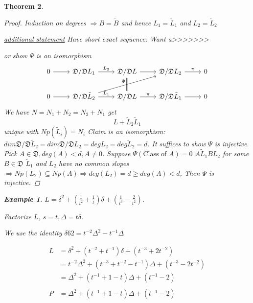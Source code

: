 \documentclass[11pt]{article}
\newtheorem{thm}{Theorem}[section]
\newtheorem{ex}[thm]{Example}
\newcommand{\frakd}{{\mathfrak D}}
\newcommand{\Lrta}{\Longrightarrow}
\begin{document}
\begin{thm}
\begin{proof}
Induction on degrees $\Lrta  B=\tilde{B}$ and hence $L_1=\tilde{L}_1$ and $L_2=\tilde{L}_2$

\underline{additional statement}
Have short exact sequence:
Want a>>>>>>>

or show $\Psi$ is an isomorphism
\[
\begin{tikzcd}
0\arrow[r]  & \frakd/\frakd L_1  \arrow[r,"L_2"] & \frakd/\frakd L\arrow[r] \arrow[d,equal] & \frakd/\frakd L_2\arrow[r,"\pi"]  & 0 \\
0\arrow[r]  & \frakd/\frakd \tilde{L}_2\ar[rru,"\Psi"]  \arrow[r,"\tilde{L}_1"] & \frakd/\frakd L\arrow[r,"\pi"] & \frakd/\frakd \tilde{L}_1\arrow[r]  & 0 
\end{tikzcd}
\]
We have $N=N_1+N_2=N_2+N_1$ get 
$$
L+\tilde{L}_2\tilde{L}_1
$$
unique with $Np(\tilde{L}_i)=N_i$
Claim is an isomorphism:
$dim \frakd/\frakd \tilde{L}_2=dim \frakd/\frakd L_2=deg L_2=deg\tilde{L}_2=d$.
It suffices to show $\Psi$ is injective. Pick $A\in\frakd,deg(A)< d, A\neq 0$. Suppose $\Psi(\text{Class of $A$})=0$ $A\tilde{L}_1B L_2$ for some $B\in \frakd$ $\tilde{L}_1$ and $L_2$ have no common slopes $\Lrta Np(L_2)\subseteq Np(A)\Lrta deg(L_2)=d\geq deg(A)< d$, Then $\Psi$ is injective.
\end{proof}

\begin{ex}
$L=\delta^2+(\frac{1}{t^2}+\frac{1}{t})\delta+(\frac{1}{t^3}-\frac{2}{t^2})$.

Factorize $L$, $s=t,\Delta=t\delta$.

We use the identity $\delta62=t^{-2}\Delta^2-t^{-1}\Delta$

$$
\begin{aligned}
L&=\delta^2+(t^{-2}+t^{-1})\delta+(t^{-3}+2t^{-2})\\
&=t^{-2}\Delta^2+(t^{-3}+t^{-2}-t^{-1})\Delta+(t^{-3}-2t^{-2})\\
&=\Delta^2+(t^{-1}+1-t)\Delta+(t^{-1}-2)\\
&\ \\
P&=\Delta^2+(t^{-1}+1-t)\Delta
+(t^{-1}-2)
\end{aligned}
$$
\end{ex}


\end{thm}
\end{document}

